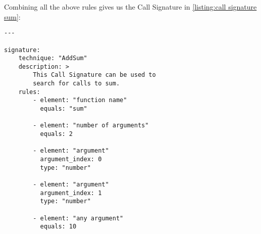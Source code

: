Combining all the above rules gives us the Call Signature in \autoref{listing:call signature sum}:
\begin{lstlisting}[label={listing:call signature sum}, caption={A Call Signature for \texttt{sum}.}, captionpos=b]
---

signature:
    technique: "AddSum"
    description: >
        This Call Signature can be used to
        search for calls to sum.
    rules:
        - element: "function name"
          equals: "sum"

        - element: "number of arguments"
          equals: 2

        - element: "argument"
          argument_index: 0
          type: "number"

        - element: "argument"
          argument_index: 1
          type: "number"

        - element: "any argument"
          equals: 10
\end{lstlisting}

